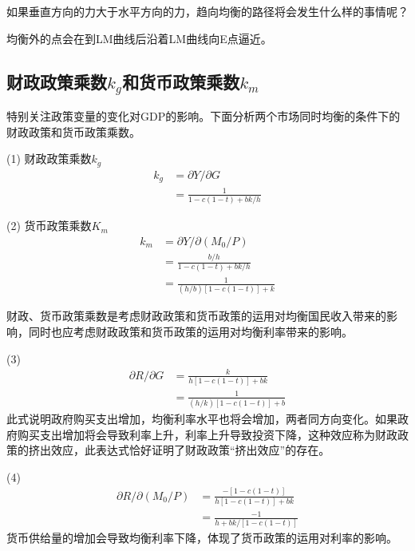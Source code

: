 \documentclass{article}
\begin{document}
如果垂直方向的力大于水平方向的力，趋向均衡的路径将会发生什么样的事情呢？

均衡外的点会在到LM曲线后沿着LM曲线向E点逼近。

\subsection{财政政策乘数$ k_g $和货币政策乘数$ k_m $}
特别关注政策变量的变化对GDP的影响。下面分析两个市场同时均衡的条件下的财政政策和货币政策乘数。

 (1) 财政政策乘数$ k_g $
\begin{equation*}
	\begin{split}
	k_g&=\partial Y/\partial G\\
	&=\frac{1}{1-c(1-t)+bk/h}
	\end{split}
\end{equation*}

(2) 货币政策乘数$ K_m $
\begin{equation*}
	\begin{split}
	k_m&=\partial Y/\partial (M_0/P)\\
	&=\frac{b/h}{1-c(1-t)+bk/h}\\
	&=\frac{1}{(h/b)[1-c(1-t)]+k}
	\end{split}
\end{equation*}

财政、货币政策乘数是考虑财政政策和货币政策的运用对均衡国民收入带来的影响，同时也应考虑财政政策和货币政策的运用对均衡利率带来的影响。

(3) 
\begin{equation*}
	\begin{split}
	\partial R/\partial G&=\frac{k}{h[1-c(1-t)]+bk}\\
	&=\frac{1}{(h/k)[1-c(1-t)]+b}
	\end{split}
\end{equation*}
此式说明政府购买支出增加，均衡利率水平也将会增加，两者同方向变化。如果政府购买支出增加将会导致利率上升，利率上升导致投资下降，这种效应称为财政政策的挤出效应，此表达式恰好证明了财政政策“挤出效应”的存在。

(4)
\begin{equation*}
	\begin{split}
	\partial R/\partial (M_0/P)&=\frac{-[1-c(1-t)]}{h[1-c(1-t)]+bk}\\
	&=\frac{-1}{h+bk/[1-c(1-t)]}
	\end{split}
\end{equation*}
货币供给量的增加会导致均衡利率下降，体现了货币政策的运用对利率的影响。
\end{document}
